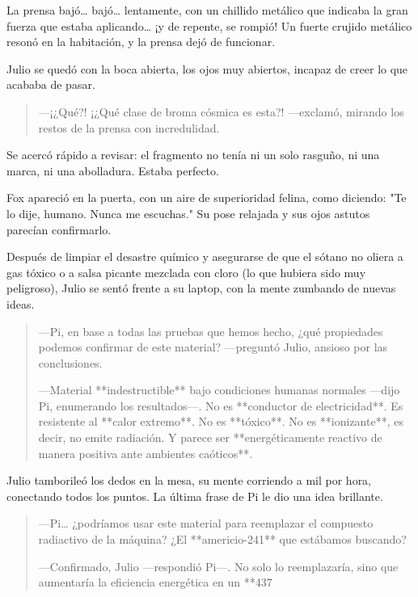 \documentclass[a4paper,12pt]{book}
\begin{document}
La prensa bajó… bajó… lentamente, con un chillido metálico que indicaba la gran fuerza que estaba aplicando… ¡y de repente, se rompió! Un fuerte crujido metálico resonó en la habitación, y la prensa dejó de funcionar.

Julio se quedó con la boca abierta, los ojos muy abiertos, incapaz de creer lo que acababa de pasar.

\begin{quote}
    —¡¿Qué?! ¡¿Qué clase de broma cósmica es esta?! —exclamó, mirando los restos de la prensa con incredulidad.
\end{quote}

Se acercó rápido a revisar: el fragmento no tenía ni un solo rasguño, ni una marca, ni una abolladura. Estaba perfecto.

Fox apareció en la puerta, con un aire de superioridad felina, como diciendo: "Te lo dije, humano. Nunca me escuchas." Su pose relajada y sus ojos astutos parecían confirmarlo.

Después de limpiar el desastre químico y asegurarse de que el sótano no oliera a gas tóxico o a salsa picante mezclada con cloro (lo que hubiera sido muy peligroso), Julio se sentó frente a su laptop, con la mente zumbando de nuevas ideas.

\begin{quote}
    —Pi, en base a todas las pruebas que hemos hecho, ¿qué propiedades podemos confirmar de este material? —preguntó Julio, ansioso por las conclusiones.

    —Material **indestructible** bajo condiciones humanas normales —dijo Pi, enumerando los resultados—. No es **conductor de electricidad**. Es resistente al **calor extremo**. No es **tóxico**. No es **ionizante**, es decir, no emite radiación. Y parece ser **energéticamente reactivo de manera positiva ante ambientes caóticos**.
\end{quote}

Julio tamborileó los dedos en la mesa, su mente corriendo a mil por hora, conectando todos los puntos. La última frase de Pi le dio una idea brillante.

\begin{quote}
    —Pi… ¿podríamos usar este material para reemplazar el compuesto radiactivo de la máquina? ¿El **americio-241** que estábamos buscando?

    —Confirmado, Julio —respondió Pi—. No solo lo reemplazaría, sino que aumentaría la eficiencia energética en un **437%
\end{quote}
\end{document}
